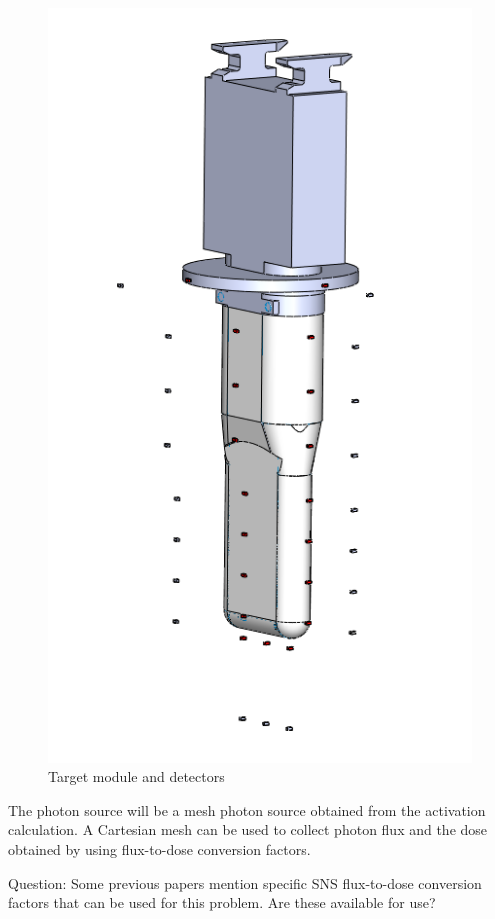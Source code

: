 \begin{figure}[ht!]
	\centering
	\includegraphics[scale=0.3,trim={0.5cm 0.5cm 0.5cm 0.5cm},clip]{figs/target_detectors.png}
	\caption{Target module and detectors}
	\label{fig:target_detectors}
\end{figure}

The photon source will be a mesh photon source obtained from the activation
calculation. A Cartesian mesh can be used to collect photon flux and the dose
obtained by using flux-to-dose conversion factors. 

Question: Some previous papers mention specific
SNS flux-to-dose conversion factors that can be used for this problem. Are these
available for use?

